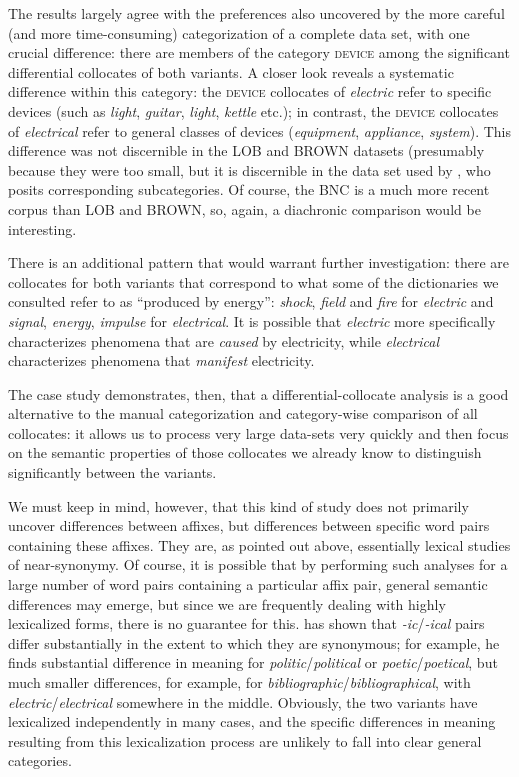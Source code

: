 The results largely agree with the preferences also uncovered by the more careful (and more time-consuming) categorization of a complete data set, with one crucial difference: there are members of the category \textsc{device} among the significant differential collocates of both variants. A closer look reveals a systematic difference within this category: the \textsc{device} collocates of \textit{electric} refer to specific devices (such as \textit{light}, \textit{guitar}, \textit{light}, \textit{kettle} etc.); in contrast, the \textsc{device} collocates of \textit{electrical} refer to general classes of devices (\textit{equipment}, \textit{appliance}, \textit{system}). This difference was not discernible in the LOB and BROWN datasets (presumably because they were too small, but it is discernible in the data set used by \citet{kaunisto_electric/electrical_1999}, who posits corresponding subcategories. Of course, the BNC is a much more recent corpus than LOB and BROWN, so, again, a diachronic comparison would be interesting.

There is an additional pattern that would warrant further investigation: there are collocates for both variants that correspond to what some of the dictionaries we consulted refer to as ``produced by energy'': \textit{shock}, \textit{field} and \textit{fire} for \textit{electric} and \textit{signal}, \textit{energy}, \textit{impulse} for \textit{electrical}. It is possible that \textit{electric} more specifically characterizes phenomena that are \textit{caused} by electricity, while \textit{electrical} characterizes phenomena that \textit{manifest} electricity. 

The case study demonstrates, then, that a differential-collocate analysis is a good alternative to the manual categorization and category-wise comparison of all collocates: it allows us to process very large data-sets very quickly and then focus on the semantic properties of those collocates we already know to distinguish significantly between the variants.

We must keep in mind, however, that this kind of study does not primarily uncover differences between affixes, but differences between specific word pairs containing these affixes. They are, as pointed out above, essentially lexical studies of near-synonymy. Of course, it is possible that by performing such analyses for a large number of word pairs containing a particular affix pair, general semantic differences may emerge, but since we are frequently dealing with highly lexicalized forms, there is no guarantee for this. \citet{gries_corpus-linguistic_2001, gries_testing_2003} has shown that \textit{-ic}/\textit{-ical} pairs differ substantially in the extent to which they are synonymous; for example, he finds substantial difference in meaning for \textit{politic}/\textit{political} or \textit{poetic}/\textit{poetical}, but much smaller differences, for example, for \textit{bibliographic}/\textit{bibliographical}, with \textit{electric}/\textit{electrical} somewhere in the middle. Obviously, the two variants have lexicalized independently in many cases, and the specific differences in meaning resulting from this lexicalization process are unlikely to fall into clear general categories.

